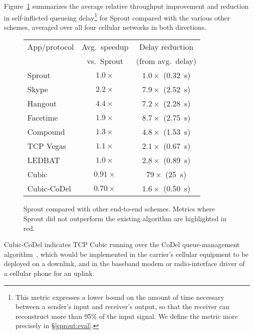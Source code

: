 Figure~\ref{f:sproutcompe2e} summarizes the average relative throughput
improvement and reduction in self-inflicted queueing
delay\footnote{This metric expresses a lower bound on the amount of
  time necessary between a sender's input and receiver's output, so
  that the receiver can reconstruct more than 95\% of the input
  signal. We define the metric more precisely in \S\ref{sprout:eval}.} for
Sprout compared with the various other schemes, averaged over all four
cellular networks in both directions.

\begin{figure}
\caption{Sprout compared with other end-to-end schemes. Metrics where
  Sprout did not outperform the existing algorithm are highlighted in
  red.}
\label{f:sproutcompe2e}

\begin{center}
\noindent \begin{tabular}{|l|c|c|}
\hline
App/protocol & Avg.~speedup & Delay reduction \\
& \footnotesize{vs.~Sprout} & \footnotesize{(from avg.~delay)}\\
\hline
\hline
\cellcolor{blue!20}Sprout & \cellcolor{blue!20}$1.0\times$ & \cellcolor{blue!20}$1.0\times$ (0.32~s) \\
\hline
Skype & $2.2\times$ & $7.9\times$ (2.52~s) \\
Hangout & $4.4\times$ & $7.2\times$ (2.28~s) \\
Facetime & $1.9\times$ & $8.7\times$ (2.75~s) \\
\hline
Compound & $1.3\times$ & $4.8\times$ (1.53~s) \\
TCP Vegas & $1.1\times$ & $2.1\times$ (0.67~s) \\
LEDBAT & $1.0\times$ & $2.8\times$ (0.89~s) \\
Cubic & \cellcolor{red!20}$0.91\times$ & $79\times$ (25~s)\\
\hline
Cubic-CoDel & \cellcolor{red!20}$0.70\times$ & $1.6\times$ (0.50~s) \\
\hline
\end{tabular}
\end{center}

\end{figure}

Cubic-CoDel indicates TCP Cubic running over the CoDel
queue-management algorithm~\cite{CoDel}, which would be implemented in the
carrier's cellular equipment to be deployed on a downlink, and in
the baseband modem or radio-interface driver of a cellular phone for an
uplink.

